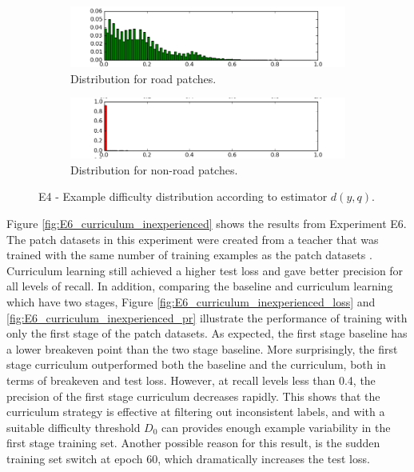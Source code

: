 \begin{figure}
\begin{subfigure}{0.5\textwidth}
\includegraphics[width=\linewidth]{figs/E4/E4-road-dist.png}
\caption{Distribution for road patches.} \label{fig:E4_difficulty_distribution_road}
\end{subfigure}
\hspace*{\fill} %
\begin{subfigure}{0.5\textwidth}
\includegraphics[width=\linewidth]{figs/E4/E4-non_road-dist.png}
\caption{Distribution for non-road patches.} \label{fig:E4_difficulty_distribution_nonroad}
\end{subfigure}
\hspace*{\fill} %
\caption[E4 - Difficulty distribution]{E4 - Example difficulty distribution according to estimator $d(y,q)$. } \label{fig:E4_difficulty_distribution}
\end{figure}

Figure \ref{fig:E6_curriculum_inexperienced} shows the results from Experiment E6. The patch datasets in this experiment were created from a teacher that was trained with the same number of training examples as the patch datasets . Curriculum learning still achieved a higher test loss and gave better precision for all levels of recall. In addition, comparing the baseline and curriculum learning which have two stages, Figure \ref{fig:E6_curriculum_inexperienced_loss} and \ref{fig:E6_curriculum_inexperienced_pr} illustrate the performance of training with only the first stage of the patch datasets. As expected, the first stage baseline has a lower breakeven point than the two stage baseline. More surprisingly, the first stage curriculum outperformed both the baseline and the curriculum, both in terms of breakeven and test loss. However, at recall levels less than 0.4, the precision of the first stage curriculum decreases rapidly. This shows that the curriculum strategy is effective at filtering out inconsistent labels, and with a suitable difficulty threshold $D_0$ can provides enough example variability in the first stage training set. Another possible reason for this result, is the sudden training set switch at epoch 60, which dramatically increases the test loss. \\

